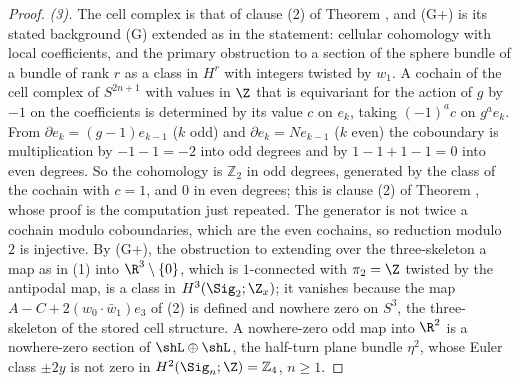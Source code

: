 \begin{proof}
\emph{(3).} The cell complex is that of clause (2) of Theorem , and (G+) is its stated background (G) extended as in the statement: cellular cohomology with local coefficients, and the primary obstruction to a section of the sphere bundle of a bundle of rank $r$ as a class in $H^{r}$ with integers twisted by $w_{1}$. A cochain of the cell complex of $S^{2n+1}$ with values in $\Z$ that is equivariant for the action of $g$ by $-1$ on the coefficients is determined by its value $c$ on $e_{k}$, taking $(-1)^{a}c$ on $g^{a}e_{k}$. From $\partial e_{k} = (g - 1)e_{k-1}$ ($k$ odd) and $\partial e_{k} = Ne_{k-1}$ ($k$ even) the coboundary is multiplication by $-1 - 1 = -2$ into odd degrees and by $1 - 1 + 1 - 1 = 0$ into even degrees. So the cohomology is $\mathbb{Z}_{2}$ in odd degrees, generated by the class of the cochain with $c = 1$, and $0$ in even degrees; this is clause (2) of Theorem , whose proof is the computation just repeated. The generator is not twice a cochain modulo coboundaries, which are the even cochains, so reduction modulo $2$ is injective. By (G+), the obstruction to extending over the three-skeleton a map as in (1) into $\R^{3} \setminus \{0\}$, which is $1$-connected with $\pi_{2} = \Z$ twisted by the antipodal map, is a class in $H^{3}(\Sig_{2}; \Z_{x})$; it vanishes because the map $A - C + 2(w_{0}\cdot \bar w_{1})e_{3}$ of (2) is defined and nowhere zero on $S^{3}$, the three-skeleton of the stored cell structure. A nowhere-zero odd map into $\R^{2}$ is a nowhere-zero section of $\shL \oplus \shL$, the half-turn plane bundle $\eta^{2}$, whose Euler class $\pm 2y$ is not zero in $H^{2}(\Sig_{n}; \Z) = \mathbb{Z}_{4}$, $n \geq 1$.


\end{proof}
